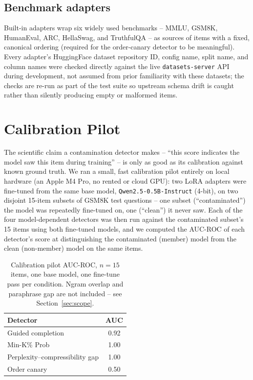 \documentclass[11pt]{article}
\begin{document}
\subsection{Benchmark adapters}

Built-in adapters wrap six widely used benchmarks -- MMLU, GSM8K,
HumanEval, ARC, HellaSwag, and TruthfulQA -- as sources of items with a
fixed, canonical ordering (required for the order-canary detector to be
meaningful). Every adapter's HuggingFace dataset repository ID, config
name, split name, and column names were checked directly against the live
\texttt{datasets-server} API during development, not assumed from prior
familiarity with these datasets; the checks are re-run as part of the
test suite so upstream schema drift is caught rather than silently
producing empty or malformed items.

\section{Calibration Pilot}
\label{sec:calibration}

The scientific claim a contamination detector makes -- ``this score
indicates the model saw this item during training'' -- is only as good as
its calibration against known ground truth. We ran a small, fast
calibration pilot entirely on local hardware (an Apple M4 Pro, no rented
or cloud GPU): two LoRA adapters were fine-tuned from the same base model,
\texttt{Qwen2.5-0.5B-Instruct} (4-bit), on two disjoint 15-item subsets of
GSM8K test questions -- one subset (``contaminated'') the model was
repeatedly fine-tuned on, one (``clean'') it never saw. Each of the four
model-dependent detectors was then run against the contaminated subset's
15 items using both fine-tuned models, and we computed the AUC-ROC of
each detector's score at distinguishing the contaminated (member) model
from the clean (non-member) model on the same items.

\begin{table}[t]
\centering
\begin{tabular}{lc}
\toprule
Detector & AUC \\
\midrule
Guided completion & 0.92 \\
Min-K\% Prob & 1.00 \\
Perplexity--compressibility gap & 1.00 \\
Order canary & 0.50 \\
\bottomrule
\end{tabular}
\caption{Calibration pilot AUC-ROC, $n=15$ items, one base model, one
fine-tune pass per condition. Ngram overlap and paraphrase gap are not
included -- see Section~\ref{sec:scope}.}
\label{tab:calibration}
\end{table}
\end{document}
